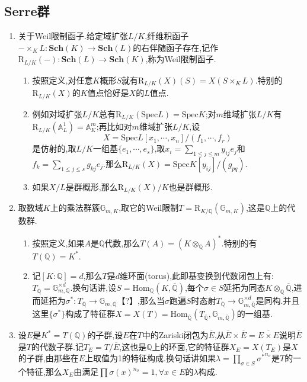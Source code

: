 \subsection{Serre群}
\begin{enumerate}
	\item 关于Weil限制函子.给定域扩张$L/K$,纤维积函子$-\times_KL:\textbf{Sch}(K)\to\textbf{Sch}(L)$的右伴随函子存在,记作$\mathrm{R}_{L/K}(-):\textbf{Sch}(L)\to\textbf{Sch}(K)$,称为Weil限制函子.
	\begin{enumerate}[(1)]
		\item 按照定义,对任意$K$概形$S$就有$\mathrm{R}_{L/K}(X)(S)=X(S\times_KL)$.特别的$\mathrm{R}_{L/K}(X)$的$K$值点恰好是$X$的$L$值点.
		\item 例如对域扩张$L/K$总有$\mathrm{R}_{L/K}(\mathrm{Spec}L)=\mathrm{Spec}K$;对$m$维域扩张$L/K$有$\mathrm{R}_{L/K}(\mathbb{A}^1_L)=\mathbb{A}_K^m$;再比如对$m$维域扩张$L/K$,设
		$$X=\mathrm{Spec}L[x_1,\cdots,x_n]/(f_1,\cdots,f_r)$$
		是仿射的,取$L/K$一组基$\{e_1,\cdots,e_s\}$,取$x_i=\sum_{1\le j\le m}y_{ij}e_j$和$f_k=\sum_{1\le j\le s}g_{kj}e_j$.那么$\mathrm{R}_{L/K}(X)=\mathrm{Spec}K[y_{ij}]/(g_{pq})$.
		\item 如果$X/L$是群概形,那么$\mathrm{R}_{L/K}(X)/K$也是群概形.
	\end{enumerate}
	\item 取数域$K$上的乘法群簇$\mathbb{G}_{m,K}$,取它的Weil限制$T=\mathrm{R}_{K/\mathbb{Q}}(\mathbb{G}_{m,K})$,这是$\mathbb{Q}$上的代数群.
	\begin{enumerate}[(1)]
		\item 按照定义,如果$A$是$\mathbb{Q}$代数,那么$T(A)=(K\otimes_{\mathbb{Q}}A)^*$.特别的有$T(\mathbb{Q})=K^*$.
		\item 记$[K:\mathbb{Q}]=d$,那么$T$是$d$维环面(torus),此即基变换到代数闭包上有:$T_{\overline{\mathbb{Q}}}=\mathbb{G}_{m,\mathbb{Q}}^{\times d}$.换句话讲,设$S=\mathrm{Hom}_{\mathbb{Q}}(K,\overline{\mathbb{Q}})$,每个$\sigma\in S$延拓为同态$K\otimes_{\mathbb{Q}}\overline{\mathbb{Q}}$,进而延拓为$\sigma^*:T_{\overline{\mathbb{Q}}}\to\mathbb{G}_{m,\overline{\mathbb{Q}}}$【?】,那么当$\sigma$跑遍$S$时态射$T_{\overline{\mathbb{Q}}}\to\mathbb{G}_{m,\overline{\mathbb{Q}}}^{\times d}$是同构.并且这里$\{\sigma^*\}$构成了特征群$X=X(T)=\mathrm{Hom}_{\overline{\mathbb{Q}}}(T_{\overline{\mathbb{Q}}},\mathbb{G}_{m,\overline{\mathbb{Q}}})$的一组基.
	\end{enumerate}
	\item 设$E$是$K^*=T(\mathbb{Q})$的子群,设$E$在$T$中的Zariski闭包为$\overline{E}$,从$\overline{E}\times\overline{E}=\overline{E\times E}$说明$\overline{E}$是$T$的代数子群.记$T_E=T/\overline{E}$,这也是$\mathbb{Q}$上的环面,它的特征群$X_E=X(T_E)$是$X$的子群,由那些在$E$上取值为1的特征构成.换句话讲如果$\lambda=\prod_{\sigma\in S}{\sigma^*}^{n_{\sigma}}$是$T$的一个特征,那么$X_E$由满足$\prod\sigma(x)^{n_{\sigma}}=1,\forall x\in E$的$\lambda$构成.

\end{enumerate}
